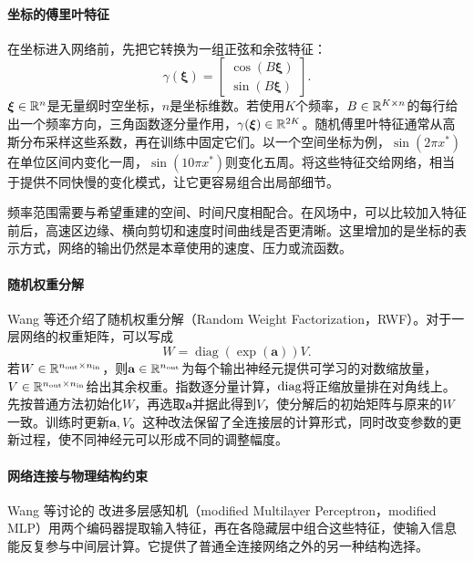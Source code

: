 \paragraph{坐标的傅里叶特征}
在坐标进入网络前，先把它转换为一组正弦和余弦特征：
\begin{equation}
 \gamma(\boldsymbol\xi)=
 \begin{bmatrix}
  \cos(B\boldsymbol\xi)\\
  \sin(B\boldsymbol\xi)
 \end{bmatrix}.
 \label{eq:pinn-fourier-features}
\end{equation}
$\boldsymbol\xi\in\mathbb{R}^n$是无量纲时空坐标，$n$是坐标维数。若使用$K$个频率，$B\in\mathbb{R}^{K\times n}$的每行给出一个频率方向，三角函数逐分量作用，$\gamma(\boldsymbol\xi)\in\mathbb{R}^{2K}$。随机傅里叶特征通常从高斯分布采样这些系数，再在训练中固定它们。以一个空间坐标为例，$\sin(2\pi x^*)$在单位区间内变化一周，$\sin(10\pi x^*)$则变化五周。将这些特征交给网络，相当于提供不同快慢的变化模式，让它更容易组合出局部细节。

频率范围需要与希望重建的空间、时间尺度相配合。在风场中，可以比较加入特征前后，高速区边缘、横向剪切和速度时间曲线是否更清晰。这里增加的是坐标的表示方式，网络的输出仍然是本章使用的速度、压力或流函数。

\paragraph{随机权重分解}
Wang 等还介绍了随机权重分解（Random Weight Factorization，RWF）。对于一层网络的权重矩阵，可以写成
\begin{equation}
 W=\operatorname{diag}(\exp(\mathbf a))V.
 \label{eq:pinn-rwf}
\end{equation}
若$W\in\mathbb{R}^{n_{\rm out}\times n_{\rm in}}$，则$\mathbf a\in\mathbb{R}^{n_{\rm out}}$为每个输出神经元提供可学习的对数缩放量，$V\in\mathbb{R}^{n_{\rm out}\times n_{\rm in}}$给出其余权重。指数逐分量计算，$\operatorname{diag}$将正缩放量排在对角线上。先按普通方法初始化$W$，再选取$\mathbf a$并据此得到$V$，使分解后的初始矩阵与原来的$W$一致。训练时更新$\mathbf a,V$。这种改法保留了全连接层的计算形式，同时改变参数的更新过程，使不同神经元可以形成不同的调整幅度。

\paragraph{网络连接与物理结构约束}
Wang 等讨论的 改进多层感知机（modified Multilayer Perceptron，modified MLP）用两个编码器提取输入特征，再在各隐藏层中组合这些特征，使输入信息能反复参与中间层计算。它提供了普通全连接网络之外的另一种结构选择\cite{wang2023expert}。

